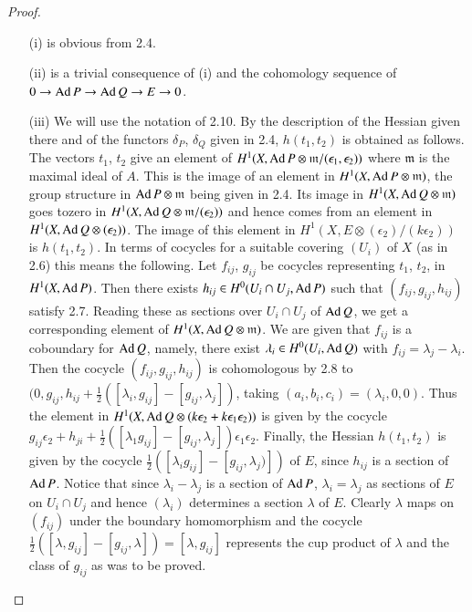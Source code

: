 \begin{proof}
\begin{itemize}
\item[(i)] is obvious from 2.4.

\item[(ii)] is a trivial consequence of (i) and the cohomology
sequence of $0\to \operatorname{Ad} P\to \operatorname{Ad} Q\to E\to 0$.

\item[(iii)] We will use the notation of 2.10. By the description of
the Hessian given there and of the functors $\delta_{P}$, $\delta_{Q}$
given in 2.4, $h(t_{1},t_{2})$ is obtained as follows. The vectors
$t_{1}$, $t_{2}$ give an element of $H^{1}(X,\operatorname{Ad}
P\otimes \mathfrak{m}/(\epsilon_{1},\epsilon_{2}))$ where
$\mathfrak{m}$ is the maximal ideal of $A$. This is the image of an
element in $H^{1}(X,\operatorname{Ad} P\otimes \mathfrak{m})$, the group structure
in $\operatorname{Ad} P\otimes \mathfrak{m}$ being given in 2.4. Its image in
$H^{1}(X,\operatorname{Ad} Q\otimes \mathfrak{m})$ goes to\pageoriginale zero in
$H^{1}(X,\operatorname{Ad} Q\otimes \mathfrak{m}/(\epsilon_{2}))$ and hence comes
from an element in $H^{1}(X,\operatorname{Ad} Q\otimes (\epsilon_{2}))$. The image
of this element in $H^{1}(X,E\otimes (\epsilon_{2})/(k\epsilon_{2}))$
is $h(t_{1},t_{2})$. In terms of cocycles for a suitable covering
$(U_{i})$ of $X$ (as in 2.6) this means the following. Let $f_{ij}$,
$g_{ij}$ be cocycles representing $t_{1}$, $t_{2}$, in $H^{1}(X,\operatorname{Ad}
P)$. Then there exists $h_{ij}\in H^{0}(U_{i}\cap U_{j},\operatorname{Ad} P)$ such
that $(f_{ij},g_{ij},h_{ij})$ satisfy 2.7. Reading these as sections
over $U_{i}\cap U_{j}$ of $\operatorname{Ad} Q$, we get a corresponding element of
$H^{1}(X,\operatorname{Ad} Q\otimes \mathfrak{m})$. We are given that $f_{ij}$ is a
coboundary for $\operatorname{Ad} Q$, namely, there exist $\lambda_{i}\in
H^{0}(U_{i},\operatorname{Ad} Q)$ with $f_{ij}=\lambda_{j}-\lambda_{i}$. Then the
cocycle $(f_{ij},g_{ij},h_{ij})$ is cohomologous by 2.8 to
$(0,g_{ij},h_{ij}+\frac{1}{2}([\lambda_{i},g_{ij}]-[g_{ij},\lambda_{j}])$,
taking $(a_{i},b_{i},c_{i})=(\lambda_{i},0,0)$. Thus the element in
$H^{1}(X,\operatorname{Ad} Q\otimes (k\epsilon_{2}+k\epsilon_{1}\epsilon_{2}))$ is
given by the cocycle
$g_{ij}\epsilon_{2}+h_{ji}+\frac{1}{2}([\lambda_{1}g_{ij}]-[g_{ij},\lambda_{j}])\epsilon_{1}\epsilon_{2}$. Finally,
the Hessian $h(t_{1},t_{2})$ is given by the cocycle
$\frac{1}{2}([\lambda_{i}g_{ij}]-[g_{ij},\lambda_{j})])$ of $E$, since
$h_{ij}$ is a section of $\operatorname{Ad} P$. Notice that since
$\lambda_{i}-\lambda_{j}$ is a section of $\operatorname{Ad} P$,
$\lambda_{i}=\lambda_{j}$ as sections of $E$ on $U_{i}\cap U_{j}$ and
hence $(\lambda_{i})$ determines a section $\lambda$ of $E$. Clearly
$\lambda$ maps on $(f_{ij})$ under the boundary homomorphism and the
cocycle
$\frac{1}{2}([\lambda,g_{ij}]-[g_{ij},\lambda])=[\lambda,g_{ij}]$
represents the cup product of $\lambda$ and the class of $g_{ij}$ as
was to be proved.
\end{itemize}
\end{proof}

